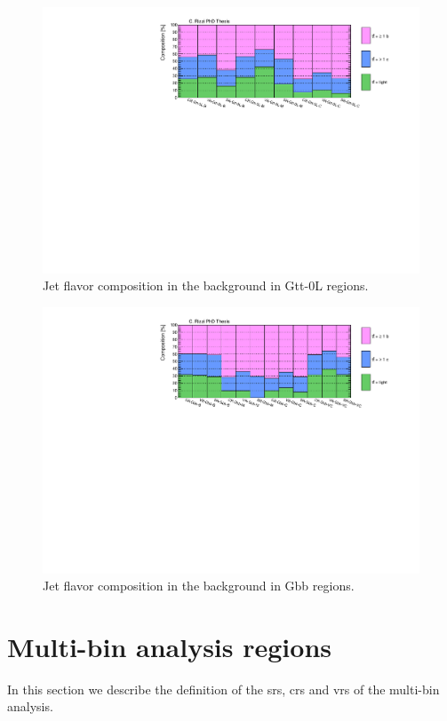 \begin{figure}[htbp]
\includegraphics[width=\textwidth]{figures/Chap8/Rizzi-Fig8-17.pdf}
\caption{Jet flavor composition in the \ttbar background in Gtt-0L regions.}
	\label{fig:HFcomp_Gtt0L}
\end{figure}

\begin{figure}[htbp]
\includegraphics[width=\textwidth]{figures/Chap8/Rizzi-Fig8-18.pdf}
\caption{Jet flavor composition in the \ttbar background in Gbb regions.}
	\label{fig:HFcomp_Gbb}
\end{figure}


\FloatBarrier

\section{Multi-bin analysis regions}
\label{sec:strong:multibin}
In this section we describe the definition of the \glspl{sr}, \glspl{cr} and \glspl{vr} 
of the multi-bin analysis. 

